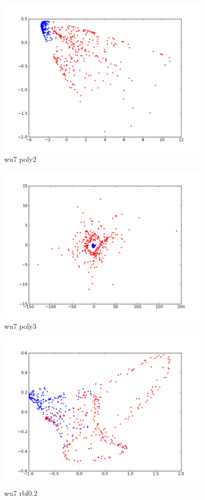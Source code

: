 \begin{figure}[here]
	\center
	\caption{wu7 poly2}
	\label{fig:wu7_poly2}
	\includegraphics[width=4.0in]{img/wu7_poly2.png}
\end{figure}

\begin{figure}[here]
	\center
	\caption{wu7 poly3}
	\label{fig:wu7_poly3}
	\includegraphics[width=4.0in]{img/wu7_poly3.png}
\end{figure}

\begin{figure}[here]
	\center
	\caption{wu7 rbf0.2}
	\label{fig:wu7_rbf0_2}
	\includegraphics[width=4.0in]{img/wu7_rbf0_2.png}
\end{figure}

